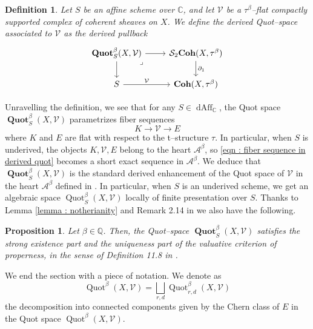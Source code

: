\documentclass[11pt]{article}
\newtheorem{definition}{Definition}
\newtheorem{proposition}[theorem]{Proposition}
\newcommand{\BC}{\mathbb{C}}
\newcommand{\BQ}{\mathbb{Q}}
\newcommand{\segal}{\mathcal{S}}
\newcommand{\abeta}{\mathcal{A}^{\beta}}
\newcommand{\cohflat}{\boldsymbol{\operatorname{Coh}}}
\newcommand{\framing}{\mathcal{V}}
\newcommand{\Quotbeta}{\operatorname{Quot}^{\beta}(X,\mathcal{V})}
\newcommand{\Quotbetard}{\operatorname{Quot}_{r,d}^{\beta}(X,\mathcal{V})}
\newcommand{\dQuot}{\boldsymbol{\operatorname{Quot}}^{\beta}_{S}(X,\mathcal{V})}
\begin{document}
\begin{definition}\label{def : der quor}
    Let $S$ be an affine scheme over $\BC$, and let $\framing$ be a $\tau^\beta$--flat compactly supported complex of coherent sheaves on $X$. We define the \textit{derived Quot--space} associated to $\framing$ as the derived pullback
    \begin{equation}\label{eqn : der Quot}
        \begin{tikzcd}
	\dQuot & {\segal_2\cohflat(X,\tau^\beta)} \\
	S & {\cohflat(X,\tau^\beta)}
	\arrow[from=1-1, to=1-2]
	\arrow[from=1-1, to=2-1]
	\arrow["\lrcorner"{anchor=center, pos=0.125}, draw=none, from=1-1, to=2-2]
	\arrow["{\partial_1}", from=1-2, to=2-2]
	\arrow[from=2-1, to=2-2, "\framing"]
\end{tikzcd}
    \end{equation}
\end{definition}

\noindent Unravelling the definition, we see that for any $S\in \operatorname{dAff}_{\BC}$, the Quot space $\dQuot$ parametrizes fiber sequences
\begin{equation}\label{eqn : fiber sequence in derived quot}
    K \rightarrow \framing \rightarrow E
\end{equation}
where $K$ and $E$ are flat with respect to the t--structure $\tau$. In particular, when $S$ is underived, the objects $K,\framing,E$ belong to the heart $\abeta$, so \eqref{eqn : fiber sequence in derived quot} becomes a short exact sequence in $\abeta$. We deduce that $\dQuot$ is the standard derived enhancement of the Quot space of $\framing$ in the heart $\abeta$ defined in \cite{Bayer_2021}. In particular, when $S$ is an underived scheme, we get an algebraic space $\operatorname{Quot}^\beta_S(X,\framing)$ locally of finite presentation over $S$. \newline
\noindent Thanks to Lemma \ref{lemma : notherianity} and Remark 2.14 in \cite{Rota_2021} we also have the following.  

\begin{proposition}
    Let $\beta\in \BQ$. Then, the Quot--space $\dQuot$ satisfies the strong existence part and the uniqueness part of the valuative criterion of properness, in the sense of Definition 11.8 in \cite{Bayer_2021}.
\end{proposition}

\noindent We end the section with a piece of notation. We denote as
\[
    \Quotbeta = \bigsqcup_{r,d} \Quotbetard
\]
the decomposition into connected components given by the Chern class of $E$ in the Quot space $\Quotbeta$.
\end{document}

